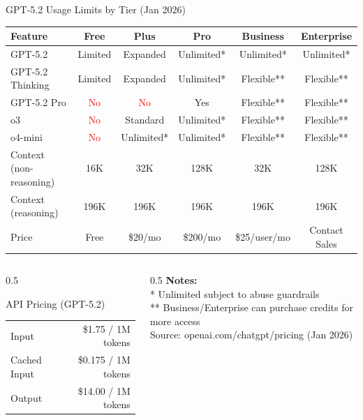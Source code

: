 \documentclass[aspectratio=169,11pt]{beamer}
\begin{document}
\begin{frame}{GPT-5.2 Usage Limits by Tier (Jan 2026)}
    \centering
    \small
    \begin{tabular}{l|c|c|c|c|c}
        \toprule
        \textbf{Feature} & \textbf{Free} & \textbf{Plus} & \textbf{Pro} & \textbf{Business} & \textbf{Enterprise} \\
        \midrule
        \rowcolor{gray!10}
        GPT-5.2 & Limited & Expanded & Unlimited* & Unlimited* & Unlimited* \\
        GPT-5.2 Thinking & Limited & Expanded & Unlimited* & Flexible** & Flexible** \\
        \rowcolor{gray!10}
        GPT-5.2 Pro & \textcolor{red}{No} & \textcolor{red}{No} & Yes & Flexible** & Flexible** \\
        o3 & \textcolor{red}{No} & Standard & Unlimited* & Flexible** & Flexible** \\
        \rowcolor{gray!10}
        o4-mini & \textcolor{red}{No} & Unlimited* & Unlimited* & Flexible** & Flexible** \\
        \midrule
        Context (non-reasoning) & 16K & 32K & 128K & 32K & 128K \\
        \rowcolor{gray!10}
        Context (reasoning) & 196K & 196K & 196K & 196K & 196K \\
        \midrule
        Price & Free & \$20/mo & \$200/mo & \$25/user/mo & Contact Sales \\
        \bottomrule
    \end{tabular}
    
    \vspace{0.3cm}
    \begin{columns}
        \begin{column}{0.5\textwidth}
            \begin{block}{API Pricing (GPT-5.2)}
                \footnotesize
                \begin{tabular}{lr}
                    Input & \$1.75 / 1M tokens \\
                    Cached Input & \$0.175 / 1M tokens \\
                    Output & \$14.00 / 1M tokens \\
                \end{tabular}
            \end{block}
        \end{column}
        \begin{column}{0.5\textwidth}
            \footnotesize
            \textbf{Notes:}\\
            * Unlimited subject to abuse guardrails\\
            ** Business/Enterprise can purchase credits for more access\\
            {\scriptsize Source: openai.com/chatgpt/pricing (Jan 2026)}
        \end{column}
    \end{columns}
\end{frame}
\end{document}
